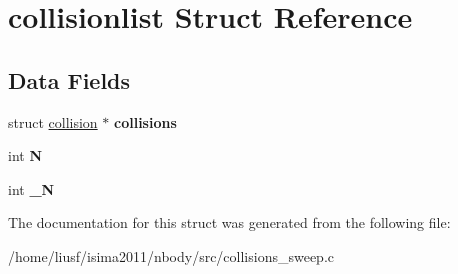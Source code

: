 \hypertarget{structcollisionlist}{
\section{collisionlist Struct Reference}
\label{structcollisionlist}
}
\subsection*{Data Fields}
\begin{DoxyCompactItemize}
\item 
\hypertarget{structcollisionlist_a54ce4683c6c0c58b88890d97a1f05a11}{
struct \hyperlink{structcollision}{collision} $\ast$ {\bfseries collisions}}
\label{structcollisionlist_a54ce4683c6c0c58b88890d97a1f05a11}

\item 
\hypertarget{structcollisionlist_aa7744751a682917cf8a203f1c1b37241}{
int {\bfseries N}}
\label{structcollisionlist_aa7744751a682917cf8a203f1c1b37241}

\item 
\hypertarget{structcollisionlist_a0f6349dfc9d0df910c1e277672ac1956}{
int {\bfseries \_\-N}}
\label{structcollisionlist_a0f6349dfc9d0df910c1e277672ac1956}

\end{DoxyCompactItemize}


The documentation for this struct was generated from the following file:\begin{DoxyCompactItemize}
\item 
/home/liusf/isima2011/nbody/src/collisions\_\-sweep.c\end{DoxyCompactItemize}
